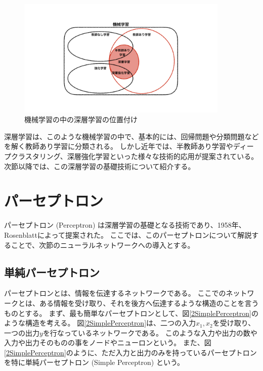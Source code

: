 \begin{figure}[htbp]
 \centering
 \includegraphics[width=0.9\textwidth]{Figure/2DeepLearning/1MachineLearning.png}
 \caption{機械学習の中の深層学習の位置付け}
 \label{1MachineLearning}
\end{figure}

深層学習は、このような機械学習の中で、基本的には、回帰問題や分類問題などを解く教師あり学習に分類される。
しかし近年では、半教師あり学習やディープクラスタリング、深層強化学習といった様々な技術的応用が提案されている。
次節以降では、この深層学習の基礎技術について紹介する。


\section{パーセプトロン} \label{DL:Perceptron}

パーセプトロン (Perceptron) は深層学習の基礎となる技術であり、1958年、Rosenblattによって提案された\cite{PerceptronPaper}。
ここでは、このパーセプトロンについて解説することで、次節のニューラルネットワークへの導入とする。


\subsection{単純パーセプトロン} \label{DL:Percep:SimplePerceptron}

パーセプトロンとは、情報を伝達するネットワークである。
ここでのネットワークとは、ある情報を受け取り、それを後方へ伝達するような構造のことを言うものとする。
まず、最も簡単なパーセプトロンとして、図\ref{2SimplePerceptron}のような構造を考える。
図\ref{2SimplePerceptron}は、二つの入力$x_1,x_2$を受け取り、一つの出力$y$を行なっているネットワークである。
このような入力や出力の数や入力や出力そのものの事をノードやニューロンという。
また、図\ref{2SimplePerceptron}のように、ただ入力と出力のみを持っているパーセプトロンを特に単純パーセプトロン (Simple Perceptron) という。

